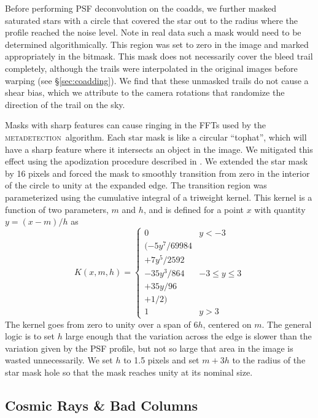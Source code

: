\documentclass[twocolumn,twocolappendix,astrosym]{openjournal}
\newcommand{\mdet}{\textsc{metadetection}}
\begin{document}
Before performing PSF deconvolution on the coadds, we further masked
saturated stars with a circle that covered the star out to the radius
where the profile reached the noise level.  Note in real data such a mask would
need to be determined algorithmically. This region was set to zero in the image
and marked appropriately in the bitmask.   This mask does not necessarily cover
the bleed trail completely, although the trails were interpolated in the
original images before warping (see \S \ref{sec:coadding}).  We find that these
unmasked trails do not cause a shear bias, which we attribute to the camera
rotations that randomize the direction of the trail on the sky.

Masks with sharp features can cause ringing in the FFTs used by the \mdet\
algorithm.   Each star mask is like a circular ``tophat'', which will have a
sharp feature where it intersects an object in the image.  We mitigated this
effect using the apodization procedure described in \citet{BeckerMdetCoadd}.
We extended the star mask by 16 pixels and forced the mask to smoothly
transition from zero in the interior of the circle to unity at the expanded
edge. The transition region was parameterized using the cumulative integral of
a triweight kernel. This kernel is a function of two parameters, $m$ and $h$,
and is defined for a point $x$ with quantity $y = (x-m)/h$ as
\begin{equation}
K(x, m, h) = \begin{cases}
0 & y < -3 \\
(-5y^7 / 69984 \\
+ 7y^5 / 2592 \\
- 35y^3 / 864 & -3 \le y \le 3 \\
+ 35y / 96 \\
+ 1 / 2) \\
1 & y > 3
\end{cases}
\end{equation}
The kernel goes from zero to unity over a span of $6h$, centered on $m$.
The general logic is to set $h$ large enough that the variation across the edge is
slower than the variation given by the PSF profile, but not so large that area
in the image is wasted unnecessarily. We set $h$ to 1.5 pixels and set $m+3h$ to
the radius of the star mask hole so that the mask reaches unity at its nominal size.

\subsection{Cosmic Rays \& Bad Columns} \label{sec:sim:cosmics_badcols}
\end{document}
